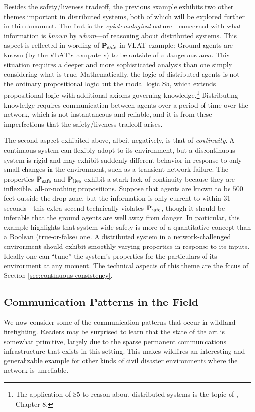 \documentclass[]             %
{NASA}                       %
\theoremstyle{definition}
\begin{document}
Besides the safety/liveness tradeoff, the previous example exhibits
two other themes important in distributed systems, both of which will
be explored further in this document. The first is the
\emph{epistemological} nature---concerned with what information is
\emph{known} by \emph{whom}---of reasoning about distributed
systems. This aspect is reflected in wording of $\textbf{P}_\textrm{safe}$ in VLAT
example: Ground agents are known (by the VLAT's computers) to be
outside of a dangerous area. This situation requires a deeper and more
sophisticated analysis than one simply considering what is
true. Mathematically, the logic of distributed agents is not the
ordinary propositional logic but the modal logic S5, which extends
propositional logic with additional axioms governing
knowledge.\footnote{The application of S5 to reason about distributed
  systems is the topic of \cite{kshemkalyani_singhal_2008}, Chapter
  8.} Distributing knowledge requires communication between agents
over a period of time over the network, which is not instantaneous and
reliable, and it is from these imperfections that the safety/liveness
tradeoff arises.

The second aspect exhibited above, albeit negatively, is that of
\emph{continuity}. A continuous system can flexibly adopt to its
environment, but a discontinuous system is rigid and may exhibit
suddenly different behavior in response to only small changes in the
environment, such as a transient network failure. The properties
$\textbf{P}_\textrm{safe}$ and $\textbf{P}_\textrm{live}$ exhibit a stark lack of continuity because they
are inflexible, all-or-nothing propositions. Suppose that agents are
known to be $500$ feet outside the drop zone, but the information is
only current to within 31 seconds---this extra second technically
violates $\textbf{P}_\textrm{safe}$, though it should be inferable that the ground
agents are well away from danger. In particular, this example
highlights that system-wide safety is more of a quantitative concept
than a Boolean (true-or-false) one. A distributed system in a
network-challenged environment should exhibit smoothly varying
properties in response to its inputs. Ideally one can ``tune'' the
system's properties for the particulars of its environment at any
moment. The technical aspects of this theme are the focus of Section
\ref{sec:continuous-consistency}.

\subsection{Communication Patterns in the Field}
\label{ssec:communication-patterns}
We now consider some of the communication patterns that occur in
wildland firefighting. Readers may be surprised to learn that the
state of the art is somewhat primitive, largely due to the sparse
permanent communications infrastructure that exists in this
setting. This makes wildfires an interesting and generalizable example
for other kinds of civil disaster environments where the network is
unreliable.
\end{document}
